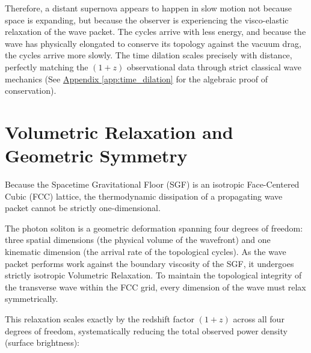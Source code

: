 Therefore, a distant supernova appears to happen in slow motion not because space is expanding, but because the observer is experiencing the visco-elastic relaxation of the wave packet. The cycles arrive with less energy, and because the wave has physically elongated to conserve its topology against the vacuum drag, the cycles arrive more slowly. The time dilation scales precisely with distance, perfectly matching the $(1+z)$ observational data through strict classical wave mechanics (See \hyperref[app:time_dilation]{Appendix \ref*{app:time_dilation}} for the algebraic proof of conservation).

\section{Volumetric Relaxation and Geometric Symmetry}
\label{sec:photonic_relaxation}

Because the Spacetime Gravitational Floor (SGF) is an isotropic Face-Centered Cubic (FCC) lattice, the thermodynamic dissipation of a propagating wave packet cannot be strictly one-dimensional.

The photon soliton is a geometric deformation spanning four degrees of freedom: three spatial dimensions (the physical volume of the wavefront) and one kinematic dimension (the arrival rate of the topological cycles). As the wave packet performs work against the boundary viscosity of the SGF, it undergoes strictly isotropic Volumetric Relaxation. To maintain the topological integrity of the transverse wave within the FCC grid, every dimension of the wave must relax symmetrically.

This relaxation scales exactly by the redshift factor $(1+z)$ across all four degrees of freedom, systematically reducing the total observed power density (surface brightness):

